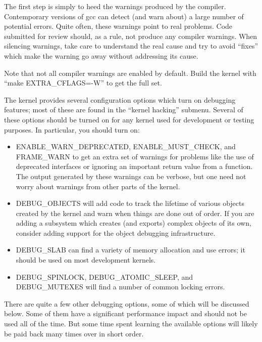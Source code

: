 \documentclass[a4paper,8pt,english]{sphinxmanual}
\begin{document}
The first step is simply to heed the warnings produced by the compiler.
Contemporary versions of gcc can detect (and warn about) a large number of
potential errors.  Quite often, these warnings point to real problems.
Code submitted for review should, as a rule, not produce any compiler
warnings.  When silencing warnings, take care to understand the real cause
and try to avoid ``fixes'' which make the warning go away without addressing
its cause.

Note that not all compiler warnings are enabled by default.  Build the
kernel with ``make EXTRA\_CFLAGS=-W'' to get the full set.

The kernel provides several configuration options which turn on debugging
features; most of these are found in the ``kernel hacking'' submenu.  Several
of these options should be turned on for any kernel used for development or
testing purposes.  In particular, you should turn on:
\begin{itemize}
\item {} 
ENABLE\_WARN\_DEPRECATED, ENABLE\_MUST\_CHECK, and FRAME\_WARN to get an
extra set of warnings for problems like the use of deprecated interfaces
or ignoring an important return value from a function.  The output
generated by these warnings can be verbose, but one need not worry about
warnings from other parts of the kernel.

\item {} 
DEBUG\_OBJECTS will add code to track the lifetime of various objects
created by the kernel and warn when things are done out of order.  If
you are adding a subsystem which creates (and exports) complex objects
of its own, consider adding support for the object debugging
infrastructure.

\item {} 
DEBUG\_SLAB can find a variety of memory allocation and use errors; it
should be used on most development kernels.

\item {} 
DEBUG\_SPINLOCK, DEBUG\_ATOMIC\_SLEEP, and DEBUG\_MUTEXES will find a
number of common locking errors.

\end{itemize}

There are quite a few other debugging options, some of which will be
discussed below.  Some of them have a significant performance impact and
should not be used all of the time.  But some time spent learning the
available options will likely be paid back many times over in short order.
\end{document}
